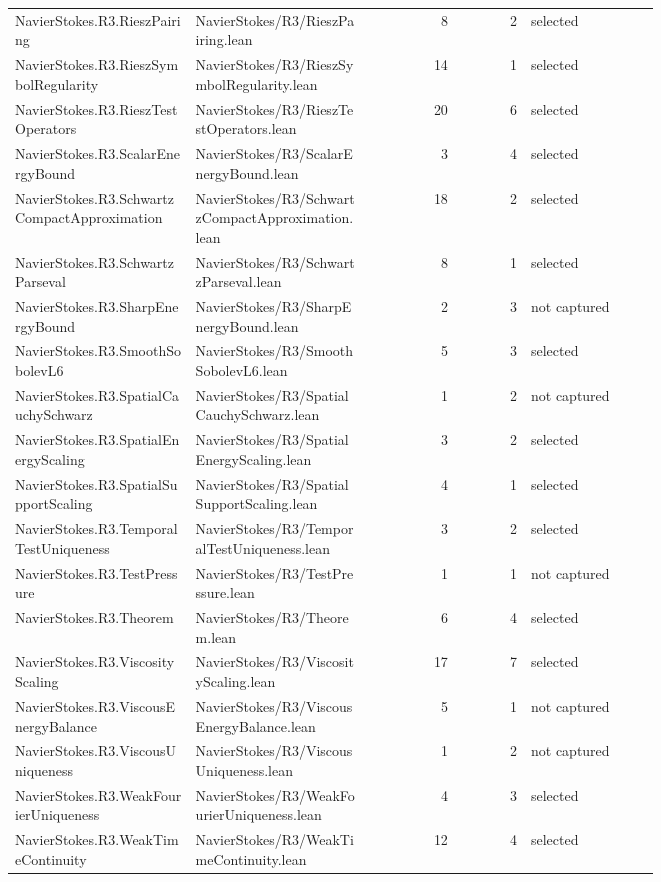 \documentclass[10pt]{article}
\begin{document}
\begin{longtable}{p{0.28\linewidth}p{0.27\linewidth}r r p{0.20\linewidth}}
NavierStokes.R3.RieszPairing & NavierStokes/R3/RieszPairing.lean & 8 & 2 & selected\\
NavierStokes.R3.RieszSymbolRegularity & NavierStokes/R3/RieszSymbolRegularity.lean & 14 & 1 & selected\\
NavierStokes.R3.RieszTestOperators & NavierStokes/R3/RieszTestOperators.lean & 20 & 6 & selected\\
NavierStokes.R3.ScalarEnergyBound & NavierStokes/R3/ScalarEnergyBound.lean & 3 & 4 & selected\\
NavierStokes.R3.SchwartzCompactApproximation & NavierStokes/R3/SchwartzCompactApproximation.lean & 18 & 2 & selected\\
NavierStokes.R3.SchwartzParseval & NavierStokes/R3/SchwartzParseval.lean & 8 & 1 & selected\\
NavierStokes.R3.SharpEnergyBound & NavierStokes/R3/SharpEnergyBound.lean & 2 & 3 & not captured\\
NavierStokes.R3.SmoothSobolevL6 & NavierStokes/R3/SmoothSobolevL6.lean & 5 & 3 & selected\\
NavierStokes.R3.SpatialCauchySchwarz & NavierStokes/R3/SpatialCauchySchwarz.lean & 1 & 2 & not captured\\
NavierStokes.R3.SpatialEnergyScaling & NavierStokes/R3/SpatialEnergyScaling.lean & 3 & 2 & selected\\
NavierStokes.R3.SpatialSupportScaling & NavierStokes/R3/SpatialSupportScaling.lean & 4 & 1 & selected\\
NavierStokes.R3.TemporalTestUniqueness & NavierStokes/R3/TemporalTestUniqueness.lean & 3 & 2 & selected\\
NavierStokes.R3.TestPressure & NavierStokes/R3/TestPressure.lean & 1 & 1 & not captured\\
NavierStokes.R3.Theorem & NavierStokes/R3/Theorem.lean & 6 & 4 & selected\\
NavierStokes.R3.ViscosityScaling & NavierStokes/R3/ViscosityScaling.lean & 17 & 7 & selected\\
NavierStokes.R3.ViscousEnergyBalance & NavierStokes/R3/ViscousEnergyBalance.lean & 5 & 1 & not captured\\
NavierStokes.R3.ViscousUniqueness & NavierStokes/R3/ViscousUniqueness.lean & 1 & 2 & not captured\\
NavierStokes.R3.WeakFourierUniqueness & NavierStokes/R3/WeakFourierUniqueness.lean & 4 & 3 & selected\\
NavierStokes.R3.WeakTimeContinuity & NavierStokes/R3/WeakTimeContinuity.lean & 12 & 4 & selected\\

\end{longtable}
\end{document}
